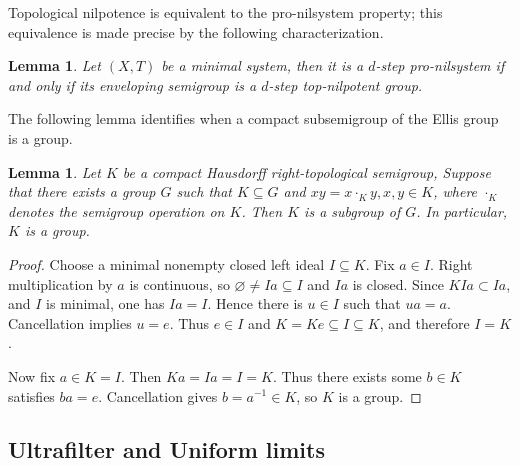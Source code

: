 \documentclass[11pt]{amsart}
\newtheorem{lemma}[theorem]{Lemma}
\theoremstyle{definition}
\theoremstyle{remark}
\begin{document}
Topological nilpotence is equivalent to the pro-nilsystem property; this equivalence is made precise by the following characterization.
 
\begin{lemma}\label{pro-nilsystem-top-nilpotent group} \cite{Donoso2014, QiuZhao2022}
Let $(X, T)$ be a minimal system, then it is a $d$-step pro-nilsystem if and only if its enveloping semigroup is a $d$-step top-nilpotent group.
\end{lemma}
 









The following lemma identifies when a compact subsemigroup of the Ellis group is a group.

\begin{lemma}\label{lem:compact-cancellative}
Let $K$ be a compact Hausdorff right-topological semigroup, Suppose that there exists a group $G$ such that $K\subseteq G$ 
and $xy=x\cdot_K y, x,y\in K$,
where $\cdot_K$ denotes the semigroup operation on $K$.
Then $K$ is a subgroup of $G$.  In particular, $K$ is a group.
\end{lemma}

 

\begin{proof}
Choose a minimal nonempty closed left ideal $I\subseteq K$.  Fix $a\in I$.
Right multiplication by $a$ is continuous, so $\varnothing\neq Ia\subseteq I$ and $Ia$ is closed.
Since $KIa\subset Ia$, and $I$ is minimal, one has $Ia=I$.
Hence there is $u\in I$ such that $ ua=a$.
Cancellation implies $u=e$.  Thus $e\in I$ and $K=Ke\subseteq I\subseteq K$,
and therefore $I=K$.

Now fix $a\in K=I$.  Then $Ka=Ia=I=K$. Thus there exists some $b\in K$ satisfies $ ba=e$.
Cancellation gives $b=a^{-1}\in K$, so $K$ is a group.
\end{proof}







\subsection{Ultrafilter and Uniform limits}\label{sec:ultrafilters}
\end{document}
